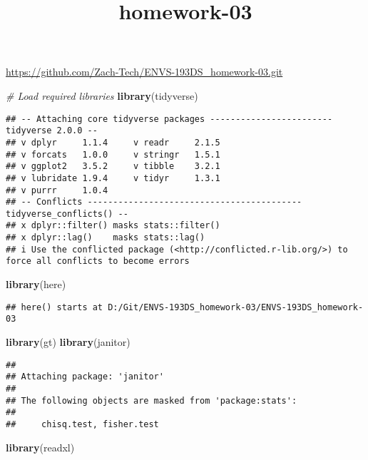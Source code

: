 \documentclass[
]{article}
\title{homework-03}
\author{}
\date{\vspace{-2.5em}}
\newenvironment{Shaded}{\begin{snugshade}}{\end{snugshade}}
\newcommand{\CommentTok}[1]{\textcolor[rgb]{0.56,0.35,0.01}{\textit{#1}}}
\newcommand{\FunctionTok}[1]{\textcolor[rgb]{0.13,0.29,0.53}{\textbf{#1}}}
\newcommand{\NormalTok}[1]{#1}
\begin{document}
\maketitle

\url{https://github.com/Zach-Tech/ENVS-193DS_homework-03.git}

\begin{Shaded}
\begin{Highlighting}[]
\CommentTok{\# Load required libraries}
\FunctionTok{library}\NormalTok{(tidyverse)}
\end{Highlighting}
\end{Shaded}

\begin{verbatim}
## -- Attaching core tidyverse packages ------------------------ tidyverse 2.0.0 --
## v dplyr     1.1.4     v readr     2.1.5
## v forcats   1.0.0     v stringr   1.5.1
## v ggplot2   3.5.2     v tibble    3.2.1
## v lubridate 1.9.4     v tidyr     1.3.1
## v purrr     1.0.4     
## -- Conflicts ------------------------------------------ tidyverse_conflicts() --
## x dplyr::filter() masks stats::filter()
## x dplyr::lag()    masks stats::lag()
## i Use the conflicted package (<http://conflicted.r-lib.org/>) to force all conflicts to become errors
\end{verbatim}

\begin{Shaded}
\begin{Highlighting}[]
\FunctionTok{library}\NormalTok{(here)}
\end{Highlighting}
\end{Shaded}

\begin{verbatim}
## here() starts at D:/Git/ENVS-193DS_homework-03/ENVS-193DS_homework-03
\end{verbatim}

\begin{Shaded}
\begin{Highlighting}[]
\FunctionTok{library}\NormalTok{(gt)}
\FunctionTok{library}\NormalTok{(janitor)}
\end{Highlighting}
\end{Shaded}

\begin{verbatim}
## 
## Attaching package: 'janitor'
## 
## The following objects are masked from 'package:stats':
## 
##     chisq.test, fisher.test
\end{verbatim}

\begin{Shaded}
\begin{Highlighting}[]
\FunctionTok{library}\NormalTok{(readxl)}
\end{Highlighting}
\end{Shaded}
\end{document}
